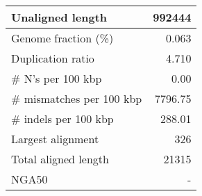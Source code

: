 \documentclass[12pt,a4paper]{article}
\begin{document}
\begin{table}[ht]
\begin{center}
\begin{tabular}{|l*{1}{|r}|}
Unaligned length & 992444 \\ \hline
Genome fraction (\%) & 0.063 \\ \hline
Duplication ratio & 4.710 \\ \hline
\# N's per 100 kbp & 0.00 \\ \hline
\# mismatches per 100 kbp & 7796.75 \\ \hline
\# indels per 100 kbp & 288.01 \\ \hline
Largest alignment & 326 \\ \hline
Total aligned length & 21315 \\ \hline
NGA50 & - \\ \hline
\end{tabular}
\end{center}
\end{table}
\end{document}
